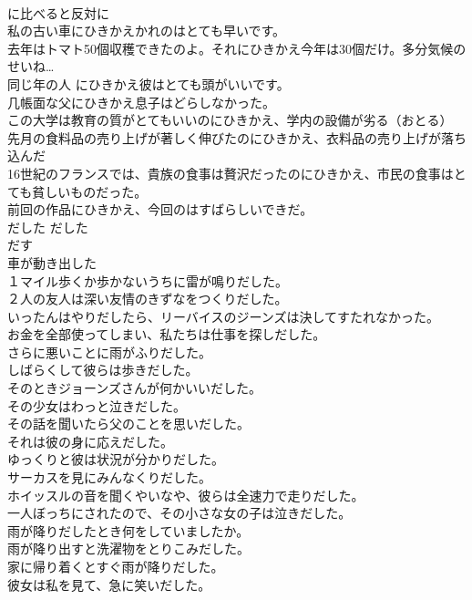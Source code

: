 \documentclass[8pt]{extreport}
\begin{document}
\begin{CJK}{UTF8}{min}
\\	に比べると反対に	
\\	私の古い車にひきかえかれのはとても早いです。  
\\	去年はトマト50個収穫できたのよ。それにひきかえ今年は30個だけ。多分気候のせいね…  
\\	同じ年の人 にひきかえ彼はとても頭がいいです。  
\\	几帳面な父にひきかえ息子はどらしなかった。  
\\	この大学は教育の質がとてもいいのにひきかえ、学内の設備が劣る（おとる）   
\\	先月の食料品の売り上げが著しく伸びたのにひきかえ、衣料品の売り上げが落ち込んだ   
\\	16世紀のフランスでは、貴族の食事は贅沢だったのにひきかえ、市民の食事はとても貧しいものだった。   
\\	前回の作品にひきかえ、今回のはすばらしいできだ。   
\\	だした	だした	
\\	だす	
\\	車が動き出した  
\\	１マイル歩くか歩かないうちに雷が鳴りだした。   
\\	２人の友人は深い友情のきずなをつくりだした。   
\\	いったんはやりだしたら、リーバイスのジーンズは決してすたれなかった。   
\\	お金を全部使ってしまい、私たちは仕事を探しだした。   
\\	さらに悪いことに雨がふりだした。   
\\	しばらくして彼らは歩きだした。   
\\	そのときジョーンズさんが何かいいだした。  
\\	その少女はわっと泣きだした。   
\\	その話を聞いたら父のことを思いだした。   
\\	それは彼の身に応えだした。   
\\	ゆっくりと彼は状況が分かりだした。   
\\	サーカスを見にみんなくりだした。   
\\	ホイッスルの音を聞くやいなや、彼らは全速力で走りだした。   
\\	一人ぼっちにされたので、その小さな女の子は泣きだした。   
\\	雨が降りだしたとき何をしていましたか。   
\\	雨が降り出すと洗濯物をとりこみだした。  
\\	家に帰り着くとすぐ雨が降りだした。   
\\	彼女は私を見て、急に笑いだした。   

\end{CJK}
\end{document}
